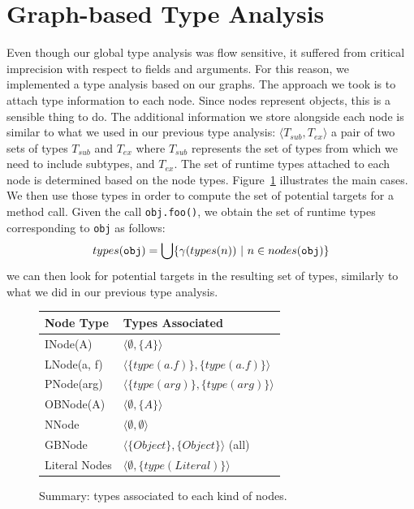 \section{Graph-based Type Analysis}
Even though our global type analysis was flow sensitive, it suffered from
critical imprecision with respect to fields and arguments. For this reason, we
implemented a type analysis based on our graphs. The approach we took is to
attach type information to each node. Since nodes represent objects, this is a
sensible thing to do. The additional information we store alongside each node
is similar to what we used in our previous type analysis: $\langle T_{sub}, T_{ex} \rangle$
a pair of two sets of types $T_{sub}$ and $T_{ex}$ where $T_{sub}$ represents
the set of types from which we need to include subtypes, and $T_{ex}$.
The set of runtime types attached to each node is determined based on the node
types. Figure~\ref{fig:pt:types} illustrates the main cases. We then use those
types in order to compute the set of potential targets for a method call. Given
the call \verb/obj.foo()/, we obtain the set of runtime types corresponding to
\verb/obj/ as follows:
$$
    types(\verb/obj/) = \bigcup \{ \gamma(types(n)) ~|~ n \in nodes(\verb/obj/) \}
$$
we can then look for potential targets in the resulting set of types, similarly
to what we did in our previous type analysis.

\begin{figure}[h]
    \centering

    \begin{tabular}{ l | l }
        Node Type & Types Associated \\
        \hline
        INode(A)           & $\langle \emptyset, \{A\}\rangle$ \\
        LNode(a, f)        & $\langle\{type(a.f)\}, \{type(a.f)\}\rangle$ \\
        PNode(arg)         & $\langle\{type(arg)\}, \{type(arg)\}\rangle$ \\
        OBNode(A)          & $\langle \emptyset,   \{A\}\rangle$ \\
        NNode              & $\langle \emptyset,   \emptyset \rangle$ \\
        GBNode             & $\langle\{Object\},   \{Object\}\rangle$ (all)\\
        Literal Nodes      & $\langle \emptyset,   \{type(Literal)\}\rangle$\\
    \end{tabular}

    \caption{Summary: types associated to each kind of nodes.}
    \label{fig:pt:types}
\end{figure}

